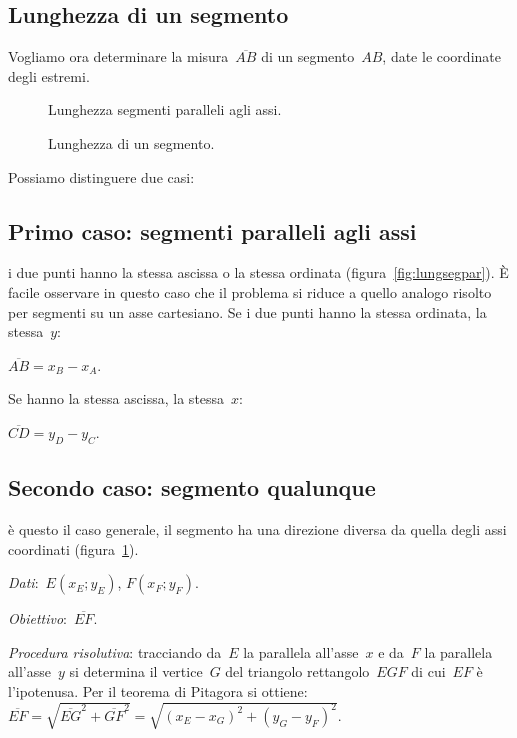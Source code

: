 \subsection{Lunghezza di un segmento}

Vogliamo ora determinare la misura~$\overline{AB}$ di un segmento~$AB$, 
date le coordinate degli estremi.

\begin{inaccessibleblock}
 \begin{figure}[h]
 \centering
 \begin{minipage}[t]{.45\textwidth}
  \centering
  \caption{Lunghezza segmenti paralleli agli assi.}\label{fig:lungsegpar}
 \end{minipage}\hfil
 \begin{minipage}[t]{.45\textwidth}
  \centering
  \caption{Lunghezza di un segmento.}\label{fig:lungseg}
 \end{minipage}\hfil
\end{figure}
\end{inaccessibleblock}

Possiamo distinguere due casi:

\subsection*{Primo caso: segmenti paralleli agli assi} i due punti hanno la 
stessa ascissa o la stessa ordinata (figura~\ref{fig:lungsegpar}). 
È facile osservare in questo caso che il problema si riduce a quello analogo
risolto per segmenti su un asse cartesiano. Se i due punti hanno la stessa 
ordinata, la stessa~$y$:

$\overline{AB} = x_B - x_A$.

Se hanno la stessa ascissa, la stessa~$x$:

$\overline{CD} = y_D - y_C$.

\subsection*{Secondo caso: segmento qualunque} è questo il caso generale, 
il segmento ha una 
direzione diversa da quella degli assi coordinati (figura~\ref{fig:lungseg}).

\emph{Dati}:~$E(x_E; y_E)$, $F(x_F;y_F)$.

\emph{Obiettivo}:~$\overline{EF}$.

\emph{Procedura risolutiva}: tracciando da~$E$ la parallela all'asse~$x$ 
e da~$F$ la parallela all'asse~$y$ si determina il vertice~$G$ del triangolo 
rettangolo~$EGF$ di cui~$EF$ è l'ipotenusa.
Per il teorema di Pitagora si 
ottiene:~$\overline{EF}=\sqrt{\overline{EG}^2 + \overline{GF}^2}=
\sqrt{\left(x_E-x_G \right)^2+\left(y_G-y_F \right)^2}$. %

